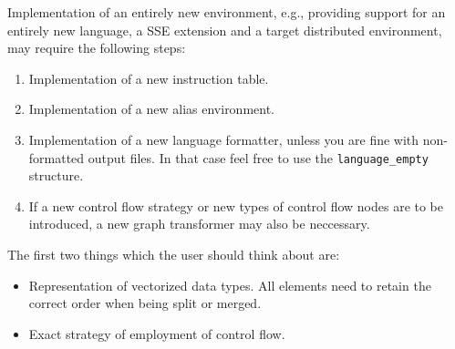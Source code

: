 Implementation of an entirely new environment, e.g., providing support for an entirely new language, a SSE extension and a target distributed environment, may require the following steps:

\begin{enumerate}
  \item Implementation of a new instruction table.
  \item Implementation of a new alias environment. 
  \item Implementation of a new language formatter, unless you are fine with non-formatted output files. In that case feel free to use the \texttt{language\_empty} structure.
  \item If a new control flow strategy or new types of control flow nodes are to be introduced, a new graph transformer may also be neccessary.
\end{enumerate}

The first two things which the user should think about are:

\begin{itemize}
  \item Representation of vectorized data types. All elements need to retain the correct order when being split or merged.
  \item Exact strategy of employment of control flow.
\end{itemize}






